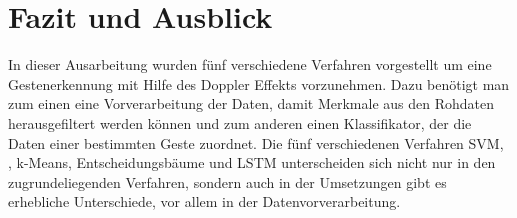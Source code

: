\section{Fazit und Ausblick} 

In dieser Ausarbeitung wurden fünf verschiedene Verfahren vorgestellt um eine
Gestenerkennung mit Hilfe des Doppler Effekts vorzunehmen. Dazu benötigt man zum
einen eine Vorverarbeitung der Daten, damit Merkmale aus den Rohdaten
herausgefiltert werden können und zum anderen einen Klassifikator, der die Daten
einer bestimmten Geste zuordnet. Die fünf verschiedenen Verfahren \ac{SVM},
, k-Means, Entscheidungsbäume und \ac{LSTM} unterscheiden sich nicht
nur in den zugrundeliegenden Verfahren, sondern auch in der Umsetzungen gibt es
erhebliche Unterschiede, vor allem in der Datenvorverarbeitung.


